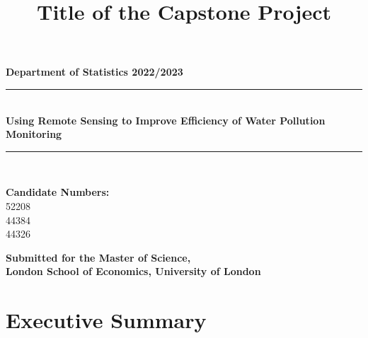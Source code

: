 \documentclass[a4paper,11pt]{report}
\title{Title of the Capstone Project}
\date{}
\newcommand{\qs}[1]{\textbf{\color{blue}#1}}
\begin{document}
\begin{titlepage}
    \newcommand{\HRule}{\rule{\linewidth}{0.5mm}}
    \centering
    \vspace*{1.8cm}
    
    \textbf{\Large Department of Statistics 2022/2023}\\
    \vspace{0.8cm}
    
    \HRule\\[0.8cm]
    
    {\LARGE \bfseries Using Remote Sensing to Improve Efficiency of Water Pollution Monitoring}\\[0.4cm] 
    
    \HRule\\[1.5cm]
    
    \vspace{0.8cm}
    
    \textbf{Candidate Numbers:}\\
    52208\\44384\\44326

    \vfill
    
    \textbf{Submitted for the Master of Science,}\\
    \textbf{London School of Economics, University of London}\\
    \vspace{1.8cm}
    
\end{titlepage}

\tableofcontents



\newpage


\listoffigures
\listoftables


\chapter*{Executive Summary}

\onehalfspacing

\end{document}
